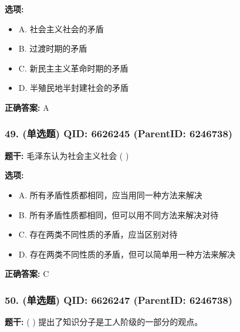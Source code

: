 \documentclass[12pt,UTF8]{ctexart}
\begin{document}
\textbf{选项:}
\begin{itemize}[leftmargin=*]

  \item A. 社会主义社会的矛盾

  \item B. 过渡时期的矛盾

  \item C. 新民主主义革命时期的矛盾

  \item D. 半殖民地半封建社会的矛盾

\end{itemize}

\textbf{正确答案:}
A

\vspace{0.3em}\hrulefill\vspace{0.7em}

\subsubsection*{49. (单选题) \small QID: 6626245 (ParentID: 6246738)}

\textbf{题干:}
毛泽东认为社会主义社会  ( )



\textbf{选项:}
\begin{itemize}[leftmargin=*]

  \item A. 所有矛盾性质都相同，应当用同一种方法来解决

  \item B. 所有矛盾性质都相同，但可以用不同方法来解决对待

  \item C. 存在两类不同性质的矛盾，应当区别对待

  \item D. 存在两类不同性质的矛盾，但可以简单用一种方法来解决

\end{itemize}

\textbf{正确答案:}
C

\vspace{0.3em}\hrulefill\vspace{0.7em}

\subsubsection*{50. (单选题) \small QID: 6626247 (ParentID: 6246738)}

\textbf{题干:}
( )  提出了知识分子是工人阶级的一部分的观点。
\end{document}
